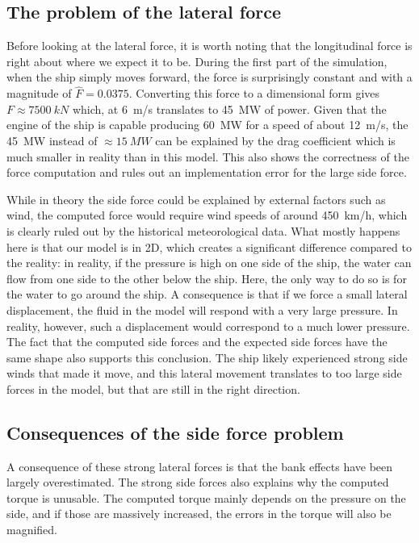 \documentclass[a4paper]{article}
\begin{document}
\subsection{The problem of the lateral force}
Before looking at the lateral force, it is worth noting that the longitudinal force is right about where we expect it to be. During the first part of the simulation, when the ship simply moves forward, the force is surprisingly constant and with a magnitude of $\hat{F} = 0.0375$. Converting this force to a dimensional form gives $F \approx \SI{7500}{kN}$ which, at \SI{6}{m/s} translates to \SI{45}{MW} of power. Given that the engine of the ship is capable producing \SI{60}{MW} for a speed of about \SI{12}{m/s}, the \SI{45}{MW} instead of $\approx \SI{15}{MW}$ can be explained by the drag coefficient which is much smaller in reality than in this model. This also shows the correctness of the force computation and rules out an implementation error for the large side force.

While in theory the side force could be explained by external factors such as wind, the computed force would require wind speeds of around \SI{450}{km/h}, which is clearly ruled out by the historical meteorological data. What mostly happens here is that our model is in 2D, which creates a significant difference compared to the reality: in reality, if the pressure is high on one side of the ship, the water can flow from one side to the other below the ship. Here, the only way to do so is for the water to go around the ship. A consequence is that if we force a small lateral displacement, the fluid in the model will respond with a very large pressure. In reality, however, such a displacement would correspond to a much lower pressure. The fact that the computed side forces and the expected side forces have the same shape also supports this conclusion. The ship likely experienced strong side winds that made it move, and this lateral movement translates to too large side forces in the model, but that are still in the right direction.

\subsection{Consequences of the side force problem}
A consequence of these strong lateral forces is that the bank effects have been largely overestimated. The strong side forces also explains why the computed torque is unusable. The computed torque mainly depends on the pressure on the side, and if those are massively increased, the errors in the torque will also be magnified. 
\end{document}
